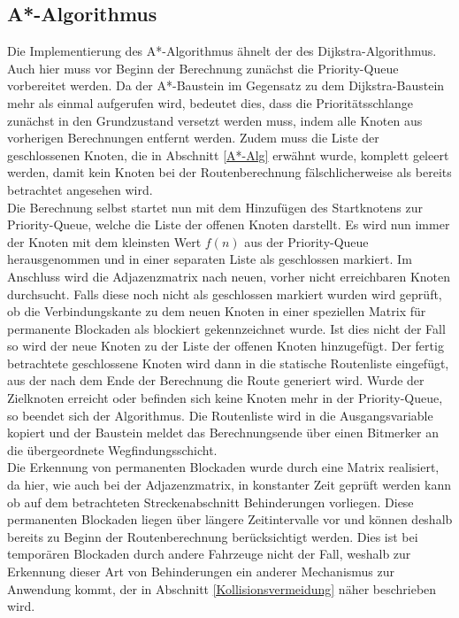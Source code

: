 		\subsection{A*-Algorithmus}
			\label{Implementierung A*}
			Die Implementierung des A*-Algorithmus ähnelt der des Dijkstra-Algorithmus. Auch hier muss vor Beginn der Berechnung zunächst die Priority-Queue vorbereitet werden. Da der A*-Baustein im Gegensatz zu dem Dijkstra-Baustein mehr als einmal aufgerufen wird,  bedeutet dies, dass die Prioritätsschlange zunächst in den Grundzustand versetzt werden muss, indem alle Knoten aus vorherigen Berechnungen entfernt werden. Zudem muss die Liste der geschlossenen Knoten, die in Abschnitt \ref{A*-Alg} erwähnt wurde, komplett geleert werden, damit kein Knoten bei der Routenberechnung fälschlicherweise als bereits betrachtet angesehen wird.
			\\[4pt]
			Die Berechnung selbst startet nun mit dem Hinzufügen des Startknotens zur Priority-Queue, welche die Liste der offenen Knoten darstellt. Es wird nun immer der Knoten mit dem kleinsten Wert $f(n)$ aus der Priority-Queue herausgenommen und in einer separaten Liste als geschlossen markiert. Im Anschluss wird die Adjazenzmatrix nach neuen, vorher nicht erreichbaren Knoten durchsucht. Falls diese noch nicht als geschlossen markiert wurden wird geprüft, ob die Verbindungskante zu dem neuen Knoten in einer speziellen Matrix für permanente Blockaden als blockiert gekennzeichnet wurde. Ist dies nicht der Fall so wird der neue Knoten zu der Liste der offenen Knoten hinzugefügt. Der fertig betrachtete geschlossene Knoten wird dann in die statische Routenliste eingefügt, aus der nach dem Ende der Berechnung die Route generiert wird. Wurde der Zielknoten erreicht oder befinden sich keine Knoten mehr in der Priority-Queue, so beendet sich der Algorithmus. Die Routenliste wird in die Ausgangsvariable kopiert und der Baustein meldet das Berechnungsende über einen Bitmerker an die übergeordnete Wegfindungsschicht.
			\\[4pt]
			Die Erkennung von permanenten Blockaden wurde durch eine Matrix realisiert, da hier, wie auch bei der Adjazenzmatrix, in konstanter Zeit geprüft werden kann ob auf dem betrachteten Streckenabschnitt Behinderungen vorliegen. Diese permanenten Blockaden liegen über längere Zeitintervalle vor und können deshalb bereits zu Beginn der Routenberechnung berücksichtigt werden. Dies ist bei temporären Blockaden durch andere Fahrzeuge nicht der Fall, weshalb zur Erkennung dieser Art von Behinderungen ein anderer Mechanismus zur Anwendung kommt, der in Abschnitt \ref{Kollisionsvermeidung} näher beschrieben wird.
			
